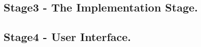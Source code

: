 \documentclass[10pt,conference]{IEEEtran}
\begin{document}
\subsection{Stage3 - The Implementation Stage. }\label{sec: 3 The Implementation Stage.}

%
\subsection{Stage4 -	User Interface. }\label{sec: 4. User Interface.}

%
%



%
%
\end{document}
